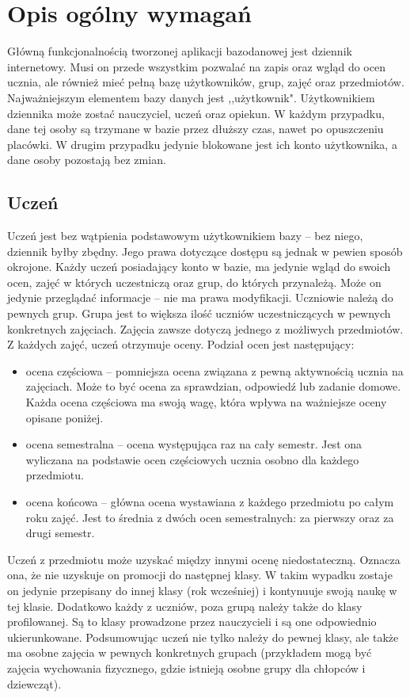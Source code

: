 \documentclass[12pt, titlepage]{article}
\begin{document}
\tableofcontents

\newpage


\section{Opis ogólny wymagań}

Główną funkcjonalnością tworzonej aplikacji bazodanowej jest dziennik internetowy. Musi on przede wszystkim pozwalać na zapis oraz wgląd do ocen ucznia, ale również mieć pełną bazę użytkowników, grup, zajęć oraz przedmiotów.
Najważniejszym elementem bazy danych jest ,,użytkownik". Użytkownikiem dziennika może zostać nauczyciel, uczeń oraz opiekun. W każdym przypadku, dane tej osoby są trzymane w bazie przez dłuższy czas, nawet po opuszczeniu placówki. W drugim przypadku jedynie blokowane jest ich konto użytkownika, a dane osoby pozostają bez zmian.

\subsection{Uczeń}

Uczeń jest bez wątpienia podstawowym użytkownikiem bazy – bez niego, dziennik byłby zbędny. Jego prawa dotyczące dostępu są jednak w pewien sposób okrojone. Każdy uczeń posiadający konto w bazie, ma jedynie wgląd do swoich ocen, zajęć w których uczestniczą oraz grup, do których przynależą. Może on jedynie przeglądać informacje – nie ma prawa modyfikacji.
Uczniowie należą do pewnych grup. Grupa jest to większa ilość uczniów uczestniczących w pewnych konkretnych zajęciach. Zajęcia zawsze dotyczą jednego z możliwych przedmiotów. Z każdych zajęć, uczeń otrzymuje oceny. Podział ocen jest następujący:
\begin{itemize}
\item ocena częściowa -- pomniejsza ocena związana z pewną aktywnością ucznia na zajęciach. Może to być ocena za sprawdzian, odpowiedź lub zadanie domowe. Każda ocena częściowa ma swoją wagę, która wpływa na ważniejsze oceny opisane poniżej.
\item ocena semestralna -- ocena występująca raz na cały semestr. Jest ona wyliczana na podstawie ocen częściowych ucznia osobno dla każdego przedmiotu.
\item ocena końcowa -- główna ocena wystawiana z każdego przedmiotu po całym roku zajęć. Jest to średnia z dwóch ocen semestralnych: za pierwszy oraz za drugi semestr.
\end{itemize}
Uczeń z przedmiotu może uzyskać między innymi ocenę niedostateczną. Oznacza ona, że nie uzyskuje on promocji do następnej klasy. W takim wypadku zostaje on jedynie przepisany do innej klasy (rok wcześniej) i kontynuuje swoją naukę w tej klasie.
Dodatkowo każdy z uczniów, poza grupą należy także do klasy profilowanej. Są to klasy prowadzone przez nauczycieli i są one odpowiednio ukierunkowane. Podsumowując uczeń nie tylko należy do pewnej klasy, ale także ma osobne zajęcia w pewnych konkretnych grupach (przykładem mogą być zajęcia wychowania fizycznego, gdzie istnieją osobne grupy dla chłopców i dziewcząt).
\end{document}

